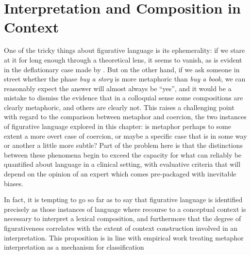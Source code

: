 \section{Interpretation and Composition in Context}
One of the tricky things about figurative language is its ephemerality: if we stare at it for long enough through a theoretical lens, it seems to vanish, as is evident in the deflationary case made by \cite{WilsonEA}.  But on the other hand, if we ask someone in street whether the phase \emph{buy a story} is more metaphoric than \emph{buy a book}, we can reasonably expect the answer will almost always be ``yes'', and it would be a mistake to dismiss the evidence that in a colloquial sense some compositions are clearly metaphoric, and others are clearly not.  This raises a challenging point with regard to the comparison between metaphor and coercion, the two instances of figurative language explored in this chapter: is metaphor perhaps to some extent a more overt case of coercion, or maybe a specific case that is in some way or another a little more subtle?  Part of the problem here is that the distinctions between these phenomena begin to exceed the capacity for what can reliably be quantified about language in a clinical setting, with evaluative criteria that will depend on the opinion of an expert which comes pre-packaged with inevitable biases.



In fact, it is tempting to go so far as to say that figurative language is identified precisely as those instances of language where recourse to a conceptual context is necessary to interpret a lexical composition, and furthermore that the degree of figurativeness correlates with the extent of context construction involved in an interpretation.  This proposition is in line with  empirical work treating metaphor interpretation as a mechanism for classification

